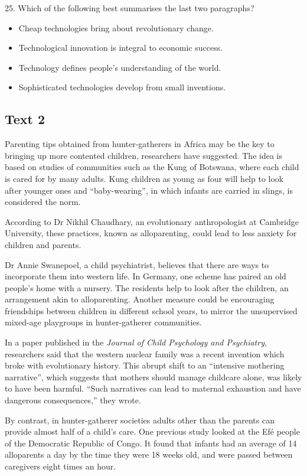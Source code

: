 \documentclass[UTF8,11pt]{ctexart}
\begin{document}
25. Which of the following best summarises the last two paragraphs?


\begin{itemize}[leftmargin=2em,itemsep=.2em,topsep=.4em]\item[A.] Cheap technologies bring about revolutionary change.
\item[B.] Technological innovation is integral to economic success.
\item[C.] Technology defines people’s understanding of the world.
\item[D.] Sophisticated technologies develop from small inventions.
\end{itemize}

\subsection*{\textbf{Text 2}}


Parenting tips obtained from hunter-gatherers in Africa may be the key to bringing up more contented children, researchers have suggested. The idea is based on studies of communities such as the Kung of Botswana, where each child is cared for by many adults. Kung children as young as four will help to look after younger ones and “baby-wearing”, in which infants are carried in slings, is considered the norm.


According to Dr Nikhil Chaudhary, an evolutionary anthropologist at Cambridge University, these practices, known as alloparenting, could lead to less anxiety for children and parents.


Dr Annie Swanepoel, a child psychiatrist, believes that there are ways to incorporate them into western life. In Germany, one scheme has paired an old people’s home with a nursery. The residents help to look after the children, an arrangement akin to alloparenting. Another measure could be encouraging friendships between children in different school years, to mirror the unsupervised mixed-age playgroups in hunter-gatherer communities.


In a paper published in the \textit{Journal of Child Psychology and Psychiatry}, researchers said that the western nuclear family was a recent invention which broke with evolutionary history. This abrupt shift to an “intensive mothering narrative”, which suggests that mothers should manage childcare alone, was likely to have been harmful. “Such narratives can lead to maternal exhaustion and have dangerous consequences,” they wrote.


By contrast, in hunter-gatherer societies adults other than the parents can provide almost half of a child’s care. One previous study looked at the Efé people of the Democratic Republic of Congo. It found that infants had an average of 14 alloparents a day by the time they were 18 weeks old, and were passed between caregivers eight times an hour.
\end{document}
